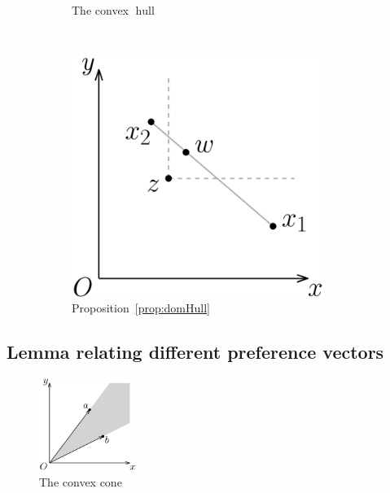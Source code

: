 \documentclass[12pt]{article}
\DeclareMathOperator*{\hull}{hull}
\newcommand{\1}[1]{\mathds{1}[{#1}]}
\begin{document}
\begin{figure}[t]
\begin{subfigure}[t]{0.3\textwidth}
        \caption{The convex $\hull$}
        \label{fig:tiger}
      \end{subfigure}
      ~
      \begin{subfigure}[t]{0.3\textwidth}
        \includegraphics[width=0.9\textwidth]{figures/propDomHull}
        \caption{Proposition~\ref{prop:domHull}}
        \label{fig:domHull}
      \end{subfigure}

      \caption{}\label{fig:animals}
    \end{figure}

  \subsection{Lemma relating different preference vectors}
    \begin{figure}
      \vspace{-1in}
      \begin{center}
        \includegraphics[width=0.28\textwidth]{figures/defCone}
      \end{center}
      \caption{The convex cone}
    \end{figure}
\end{document}
